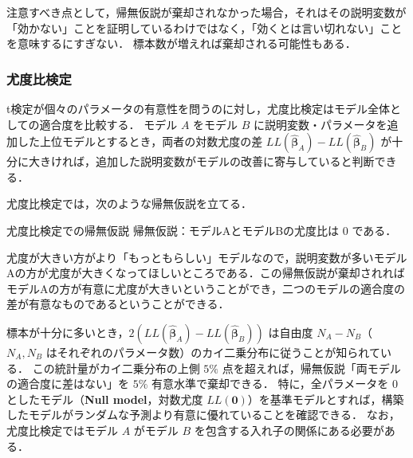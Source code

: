 注意すべき点として，帰無仮説が棄却されなかった場合，それはその説明変数が「効かない」ことを証明しているわけではなく，「効くとは言い切れない」ことを意味するにすぎない．
標本数が増えれば棄却される可能性もある．

\subsubsection{尤度比検定}\label{sec:likelihood_ratio}
t検定が個々のパラメータの有意性を問うのに対し，尤度比検定はモデル全体としての適合度を比較する．
モデル $A$ をモデル $B$ に説明変数・パラメータを追加した上位モデルとするとき，両者の対数尤度の差 $LL(\hat{\bm\beta}_A) - LL(\hat{\bm\beta}_B)$ が十分に大きければ，追加した説明変数がモデルの改善に寄与していると判断できる．

尤度比検定では，次のような帰無仮説を立てる．

\begin{itembox}[l]{尤度比検定での帰無仮説}
    帰無仮説：モデルAとモデルBの尤度比は $0$ である．
\end{itembox}

尤度が大きい方がより「もっともらしい」モデルなので，説明変数が多いモデルAの方が尤度が大きくなってほしいところである．この帰無仮説が棄却されればモデルAの方が有意に尤度が大きいということができ，二つのモデルの適合度の差が有意なものであるということができる．

標本が十分に多いとき，$2(LL(\hat{\bm\beta}_A) - LL(\hat{\bm\beta}_B))$ は自由度 $N_A - N_B$（$N_A, N_B$ はそれぞれのパラメータ数）のカイ二乗分布に従うことが知られている．
この統計量がカイ二乗分布の上側 $5\%$ 点を超えれば，帰無仮説「両モデルの適合度に差はない」を $5\%$ 有意水準で棄却できる．
特に，全パラメータを $0$ としたモデル（\textbf{Null model}，対数尤度 $LL(\bm{0})$）を基準モデルとすれば，構築したモデルがランダムな予測より有意に優れていることを確認できる．
なお，尤度比検定ではモデル $A$ がモデル $B$ を包含する入れ子の関係にある必要がある．


